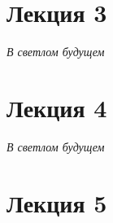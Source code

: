 


    
    \newpage
    \hypertarget{intro}{}
    \tableofcontents
    \newpage
    
    
    
    
    
    \section{Лекция 3}
    \textit{В светлом будущем}

    \section{Лекция 4}
    \textit{В светлом будущем}
    
    \section{Лекция 5}
    

    
        
    
    \newpage
    
